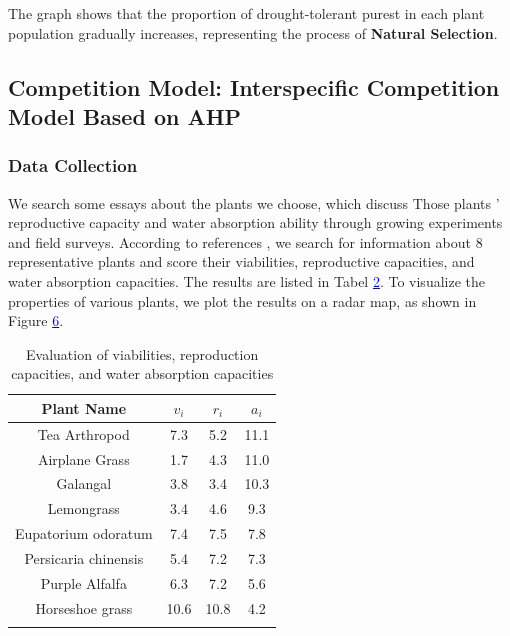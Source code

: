 \documentclass{mcmthesis}
\begin{document}
The graph shows that the proportion of drought-tolerant purest in each plant population gradually increases, representing the process of \textbf{Natural Selection}.

\subsection{Competition Model: Interspecific Competition Model Based on AHP}

\subsubsection{Data Collection}

\indent

We search some essays about the plants we choose, which discuss
Those plants ' reproductive capacity and water absorption ability through growing experiments and field surveys. According to references \cite{3}\cite{4}, we search for information about $8$ representative plants and score their viabilities, reproductive capacities, and water absorption capacities. The results are listed in Tabel \hyperref[tab:Evaluation]{\textcolor{blue}{2}}. To visualize the properties of various plants, we plot the results on a radar map, as shown in Figure  \hyperref[fig:radar]{\textcolor{blue}{6}}.

\begin{table}[htbp]
\caption{Evaluation of viabilities, reproduction capacities, and water absorption capacities}
\centering
\begin{tabular}{@{}cccc@{}}
\toprule
Plant Name & $v_i$ & $r_i$ & $a_i$ \\
\midrule
Tea Arthropod & 7.3 & 5.2 & 11.1 \\
Airplane Grass & 1.7 & 4.3 & 11.0 \\
Galangal & 3.8 & 3.4 & 10.3 \\
Lemongrass & 3.4 & 4.6 & 9.3 \\
Eupatorium odoratum & 7.4 & 7.5 & 7.8 \\
Persicaria chinensis & 5.4 & 7.2 & 7.3 \\
Purple Alfalfa & 6.3 & 7.2 & 5.6 \\
Horseshoe grass & 10.6 & 10.8 & 4.2 \\
\bottomrule
\label{tab:Evaluation}
\end{tabular}
\end{table}
\end{document}
